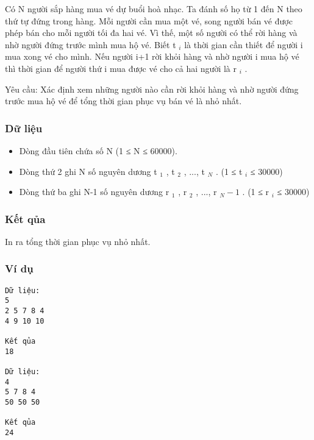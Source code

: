 



   Có N người sắp hàng mua vé dự buổi hoà nhạc. Ta đánh số họ từ 1 đến N theo thứ tự   đứng trong hàng. Mỗi người cần mua một vé, song người bán vé được phép bán cho mỗi   người tối đa hai vé. Vì thế, một số người có thể rời hàng và nhờ người đứng trước mình mua   hộ vé. Biết t   $_    i   $   là thời gian cần thiết để người i mua xong vé cho mình. Nếu người   i+1 rời khỏi hàng và nhờ người i mua hộ vé thì thời gian để người thứ i mua được vé cho cả   hai người là r   $_    i   $   .  

   Yêu cầu: Xác định xem những người nào cần rời khỏi hàng và nhờ người đứng trước mua   hộ vé để tổng thời gian phục vụ bán vé là nhỏ nhất.  

\subsubsection{   Dữ liệu  }
\begin{itemize}
	\item     Dòng đầu tiên chứa số N (1 ≤ N ≤ 60000).   
	\item     Dòng thứ 2 ghi N số nguyên dương t    $_     1    $    , t    $_     2    $    , ...,   t    $_     N    $    . (1 ≤ t    $_     i    $    ≤ 30000)   
	\item     Dòng thứ ba ghi N-1 số nguyên dương r    $_     1    $    , r    $_     2    $    , ...,   r    $_     N-1    $    . (1 ≤ r    $_     i    $    ≤ 30000)   
\end{itemize}

\subsubsection{   Kết qủa  }

   In ra tổng thời gian phục vụ nhỏ nhất.  

\subsubsection{   Ví dụ  }
\begin{verbatim}
Dữ liệu:
5
2 5 7 8 4
4 9 10 10 

Kết qủa
18

Dữ liệu:
4
5 7 8 4
50 50 50 

Kết qủa
24
\end{verbatim}